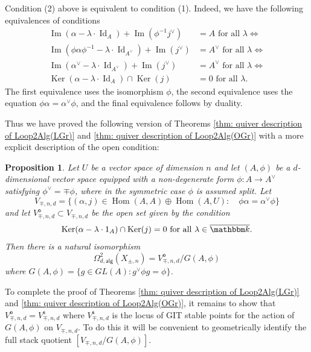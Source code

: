 \message{ !name(Bryan-Vakil.tex)}\documentclass{amsart}
\newtheorem{proposition}[theorem]{Proposition}
\theoremstyle{definition}
\newcommand{\kk} {{\mathbbm k}}
\newcommand{\Hom}{\operatorname{Hom}}
\newcommand{\Ker}{\operatorname{Ker}}
\newcommand{\im}{\operatorname{Im}}
\newcommand{\alg}{\mathsf{alg}}
\newcommand{\open}{\mathsf{o}}
\newcommand{\stable}{\mathsf{s}}
\newcommand{\LoopTwo}{\Omega^{2}_{d,\alg}}
\newcommand{\Id}{\operatorname{Id}}
\newcommand{\Xpm}{X_{\pm,n}}
\begin{document}
\bigskip

Condition (2) above is equivalent to condition (1). Indeed, we have
the following equivalences of conditions
\begin{align*}
\im (\alpha -\lambda \cdot \Id_{A})+  \im (\phi^{-1}j^{\vee} )&=A
\text{ for all } \lambda \iff \\
\im (\phi \alpha\phi^{-1} -\lambda \cdot \Id_{A^{\vee }})+  \im
(j^{\vee} )&=A^{\vee }
\text{ for all } \lambda \iff \\
\im (\alpha^{\vee } -\lambda \cdot \Id_{A^{\vee }})+ \im
(j^{\vee} )&=A^{\vee }
\text{ for all } \lambda \iff \\
\Ker (\alpha -\lambda \cdot \Id_{A})\cap \Ker (j) &= 0 \text{ for all } \lambda .
\end{align*}
The first equivalence uses the isomorphism $\phi$, the second
equivalence uses the equation $\phi \alpha  = \alpha^{\vee}\phi$, and
the final equivalence follows by duality.

Thus we have proved the following version of Theorems \ref{thm: quiver
description of Loop2Alg(LGr)} and \ref{thm: quiver description of
Loop2Alg(OGr)} with a more explicit description of the open condition:
\begin{proposition}\label{prop: quiver description of Loop2Alg(Xpm)
with explicit open condition}
Let $U$ be a vector space of dimension $n$ and let $(A,\phi )$ be a
$d$-dimensional vector space equipped with a non-degenerate form $\phi
:A\to A^{\vee}$ satisfying $\phi^{\vee}=\mp \phi$, where in the
symmetric case $\phi$ is assumed split. Let
\[
V_{\mp ,n,d} = \{(\alpha ,j)\in \Hom (A,A)\oplus \Hom (A,U):\quad \phi
\alpha =\alpha^{\vee}\phi \}
\]
and let $V^{\open}_{\mp ,n,d}\subset V_{\mp ,n,d}$ be the open set given
by the condition
\[
\Ker (\alpha -\lambda \cdot 1_{A})\cap \Ker (j) = 0\text{ for all } \lambda \in \overline{\kk}.
\]
Then there is a natural isomorphism
\[
\LoopTwo (\Xpm ) = V^{\open}_{\mp ,n,d}/G(A,\phi )
\]
where $G(A,\phi ) = \{g\in GL(A): g^{\vee}\phi g = \phi \}$. 
\end{proposition}

To complete the proof of Theorems \ref{thm: quiver description of
Loop2Alg(LGr)} and \ref{thm: quiver description of Loop2Alg(OGr)}, it
remains to show that $V^{\open}_{\mp ,n,d} = V^{\stable }_{\mp ,n,d}$
where $V^{\stable }_{\mp ,n,d}$ is the locus of GIT stable points for
the action of $G(A,\phi )$ on $V_{\mp ,n,d}$. To do this it will be
convenient to geometrically identify the full stack quotient $[V_{\mp
,n,d} / G(A,\phi )]$.
\end{document}
